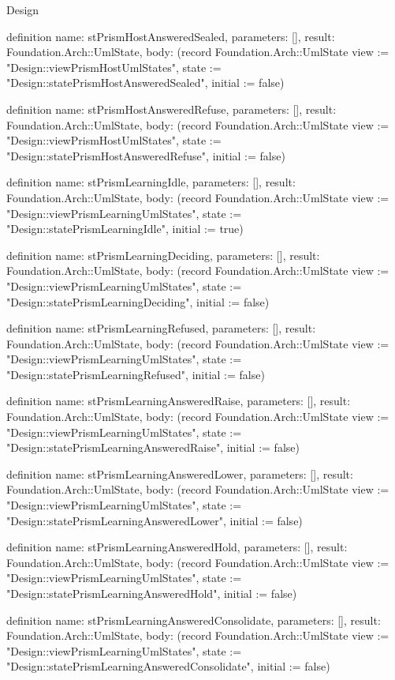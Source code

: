 \begin{lexlean}{Design}
\begin{semanticmodule}
definition{
  name: stPrismHostAnsweredSealed,
  parameters: [],
  result: Foundation.Arch::UmlState,
  body: (record Foundation.Arch::UmlState {view := "Design::viewPrismHostUmlStates", state := "Design::statePrismHostAnsweredSealed", initial := false})
}

definition{
  name: stPrismHostAnsweredRefuse,
  parameters: [],
  result: Foundation.Arch::UmlState,
  body: (record Foundation.Arch::UmlState {view := "Design::viewPrismHostUmlStates", state := "Design::statePrismHostAnsweredRefuse", initial := false})
}

definition{
  name: stPrismLearningIdle,
  parameters: [],
  result: Foundation.Arch::UmlState,
  body: (record Foundation.Arch::UmlState {view := "Design::viewPrismLearningUmlStates", state := "Design::statePrismLearningIdle", initial := true})
}

definition{
  name: stPrismLearningDeciding,
  parameters: [],
  result: Foundation.Arch::UmlState,
  body: (record Foundation.Arch::UmlState {view := "Design::viewPrismLearningUmlStates", state := "Design::statePrismLearningDeciding", initial := false})
}

definition{
  name: stPrismLearningRefused,
  parameters: [],
  result: Foundation.Arch::UmlState,
  body: (record Foundation.Arch::UmlState {view := "Design::viewPrismLearningUmlStates", state := "Design::statePrismLearningRefused", initial := false})
}

definition{
  name: stPrismLearningAnsweredRaise,
  parameters: [],
  result: Foundation.Arch::UmlState,
  body: (record Foundation.Arch::UmlState {view := "Design::viewPrismLearningUmlStates", state := "Design::statePrismLearningAnsweredRaise", initial := false})
}

definition{
  name: stPrismLearningAnsweredLower,
  parameters: [],
  result: Foundation.Arch::UmlState,
  body: (record Foundation.Arch::UmlState {view := "Design::viewPrismLearningUmlStates", state := "Design::statePrismLearningAnsweredLower", initial := false})
}

definition{
  name: stPrismLearningAnsweredHold,
  parameters: [],
  result: Foundation.Arch::UmlState,
  body: (record Foundation.Arch::UmlState {view := "Design::viewPrismLearningUmlStates", state := "Design::statePrismLearningAnsweredHold", initial := false})
}

definition{
  name: stPrismLearningAnsweredConsolidate,
  parameters: [],
  result: Foundation.Arch::UmlState,
  body: (record Foundation.Arch::UmlState {view := "Design::viewPrismLearningUmlStates", state := "Design::statePrismLearningAnsweredConsolidate", initial := false})
}


\end{semanticmodule}
\end{lexlean}
